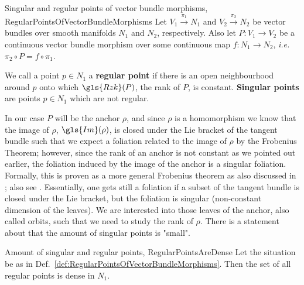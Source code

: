 \begin{definitions}{Singular and regular points of vector bundle morphisms, \newline \cite[\S 4; generalization of third remark after Theorem 4.1; page 17]{DaSilva}}{RegularPointsOfVectorBundleMorphisms}
Let $V_1 \stackrel{\pi_1}{\to} N_1$ and $V_2 \stackrel{\pi_2}{\to} N_2$ be vector bundles over smooth manifolds $N_1$ and $N_2$, respectively. Also let $P: V_1 \to V_2$ be a continuous vector bundle morphism over some continuous map $f: N_1 \to N_2$, \textit{i.e.}~$\pi_2 \circ P = f \circ \pi_1$.

We call a point $p \in N_1$ a \textbf{regular point} if there is an open neighbourhood around $p$ onto which $\gls{Rzk}(P)$, the rank of $P$, is constant. \textbf{Singular points} are points $p \in N_1$ which are not regular.
\end{definitions}

In our case $P$ will be the anchor $\rho$, and since $\rho$ is a homomorphism we know that the image of $\rho$, $\gls{Im}(\rho)$, is closed under the Lie bracket of the tangent bundle such that we expect a foliation related to the image of $\rho$ by the Frobenius Theorem; however, since the rank of an anchor is not constant as we pointed out earlier, the foliation induced by the image of the anchor is a singular foliation. Formally, this is proven as a more general Frobenius theorem as also discussed in \cite[discussion after the definition in \S 16.1; page 113]{DaSilva}; also see \cite[beginning of \S 3.1]{meinrenkensplitting}. Essentially, one gets still a foliation if a subset of the tangent bundle is closed under the Lie bracket, but the foliation is singular (non-constant dimension of the leaves). We are interested into those leaves of the anchor, also called orbits, such that we need to study the rank of $\rho$. There is a statement about that the amount of singular points is "small".

\begin{propositions}{Amount of singular and regular points, \newline \cite[generalization of second remark after Theorem 4.1; page 17]{DaSilva}}{RegularPointsAreDense}
Let the situation be as in Def.~\ref{def:RegularPointsOfVectorBundleMorphisms}. Then the set of all regular points is dense in $N_1$.
\end{propositions}

